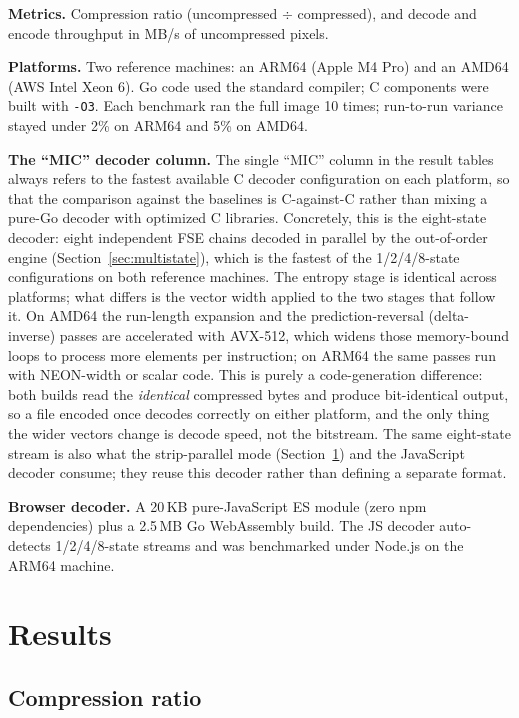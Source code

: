 \documentclass[journal]{IEEEtran}
\begin{document}
\textbf{Metrics.} Compression ratio (uncompressed $\div$ compressed), and
decode and encode throughput in MB/s of uncompressed pixels.

\textbf{Platforms.} Two reference machines: an ARM64 (Apple M4 Pro) and an
AMD64 (AWS Intel Xeon 6). Go code used the standard compiler; C components were
built with \texttt{-O3}. Each benchmark ran the full image 10 times;
run-to-run variance stayed under 2\% on ARM64 and 5\% on AMD64.

\textbf{The ``MIC'' decoder column.} The single ``MIC'' column in the result
tables always refers to the fastest available C decoder configuration on each
platform, so that the comparison against the baselines is C-against-C rather
than mixing a pure-Go decoder with optimized C libraries. Concretely, this is
the eight-state decoder: eight independent FSE chains decoded in parallel by the
out-of-order engine (Section~\ref{sec:multistate}), which is the fastest of the
1/2/4/8-state configurations on both reference machines. The entropy stage is
identical across platforms; what differs is the vector width applied to the two
stages that follow it. On AMD64 the run-length expansion and the
prediction-reversal (delta-inverse) passes are accelerated with AVX-512, which
widens those memory-bound loops to process more elements per instruction; on
ARM64 the same passes run with NEON-width or scalar code. This is purely a
code-generation difference: both builds read the \emph{identical} compressed
bytes and produce bit-identical output, so a file encoded once decodes correctly
on either platform, and the only thing the wider vectors change is decode speed,
not the bitstream. The same eight-state stream is also what the strip-parallel
mode (Section~\ref{sec:results}) and the JavaScript decoder consume; they reuse
this decoder rather than defining a separate format.

\textbf{Browser decoder.} A 20\,KB pure-JavaScript ES module (zero npm
dependencies) plus a 2.5\,MB Go WebAssembly build. The JS decoder
auto-detects 1/2/4/8-state streams and was benchmarked under Node.js on the
ARM64 machine.

\section{Results}
\label{sec:results}

\subsection{Compression ratio}
\end{document}
